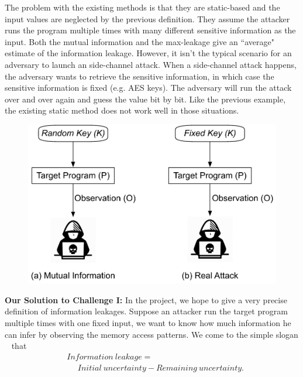 The problem with the existing methods is that they are static-based and the 
input values are neglected by the previous definition. 
They assume the attacker runs the program multiple times with many different sensitive 
information as the input. Both the mutual information and the max-leakage give an ``average" 
estimate of the information leakage. However, it isn't the typical scenario for an adversary to 
launch an side-channel attack. When a side-channel attack happens, the adversary wants 
to retrieve the sensitive information, in which case the sensitive information is fixed (e.g. AES keys). 
The adversary will run the attack over and over again and guess the value bit by bit. Like the 
previous example, the existing static method does not work well in those situations.

\begin{figure}
  \centering
   \includegraphics[width=.9\columnwidth]{./figures/RA.pdf}
   \caption{}
\end{figure}

\vspace*{6pt}
\textbf{Our Solution to Challenge I:}
In the project, we hope to give a very precise definition of information leakages. 
Suppose an attacker run the target program multiple times with one fixed input, we
want to know how much information he can infer by observing the memory access patterns.
We come to the simple slogan ~\cite{10.1007/978-3-642-00596-1_21} %
that
\begin{align*}
 & \mathit{Information\ leakage} = \\
 & ~~~~~~ \mathit{Initial}\ \mathit{uncertainty} - \mathit{Remaining\ uncertainty}. 
\end{align*}


